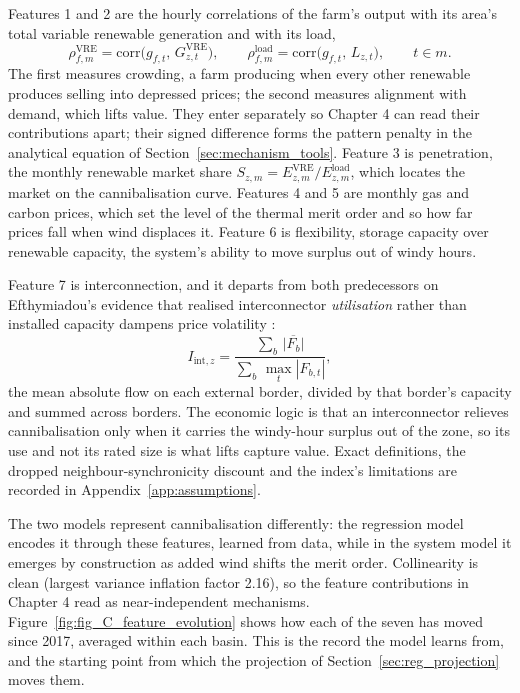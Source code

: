 Features 1 and 2 are the hourly correlations of the farm's output with its
area's total variable renewable generation and with its load,
%
\begin{equation}
    \rho^{\mathrm{VRE}}_{f,m} = \mathrm{corr}\bigl(g_{f,t},\,
    G^{\mathrm{VRE}}_{z,t}\bigr), \qquad
    \rho^{\mathrm{load}}_{f,m} = \mathrm{corr}\bigl(g_{f,t},\,
    L_{z,t}\bigr), \qquad t \in m.
    \label{eq:correlations}
\end{equation}
%
The first measures crowding, a farm producing when every other renewable
produces selling into depressed prices; the second measures alignment with
demand, which lifts value. They enter separately so Chapter 4 can read their
contributions apart; their signed difference forms the pattern penalty in the
analytical equation of Section~\ref{sec:mechanism_tools}. Feature 3 is
penetration, the monthly renewable market share $S_{z,m} =
E^{\mathrm{VRE}}_{z,m} / E^{\mathrm{load}}_{z,m}$, which locates the market on
the cannibalisation curve. Features 4 and 5 are monthly gas and carbon prices,
which set the level of the thermal merit order and so how far prices fall when
wind displaces it. Feature 6 is flexibility, storage capacity over renewable
capacity, the system's ability to move surplus out of windy hours.

Feature 7 is interconnection, and it departs from both predecessors on
Efthymiadou's evidence that realised interconnector \emph{utilisation} rather
than installed capacity dampens price volatility
\cite{Efthymiadou2025, Jacquet2024}:
%
\begin{equation}
    I_{\mathrm{int},z} =
    \frac{\sum_{b}\, \overline{|F_{b}|}}{\sum_{b}\, \max_{t} |F_{b,t}|},
    \label{eq:interconnection}
\end{equation}
%
the mean absolute flow on each external border, divided by that border's
capacity and summed across borders. The economic logic is that an
interconnector relieves cannibalisation only when it carries the
windy-hour surplus out of the zone, so its use and not its rated size is what
lifts capture value. Exact definitions, the dropped neighbour-synchronicity
discount and the index's limitations are recorded in
Appendix~\ref{app:assumptions}.

The two models represent cannibalisation differently: the regression model
encodes it through these features, learned from data, while in the system model
it emerges by construction as added wind shifts the merit order. Collinearity is
clean (largest variance inflation factor 2.16), so the feature contributions in
Chapter 4 read as near-independent mechanisms.
Figure~\ref{fig:fig_C_feature_evolution} shows how each of the seven has moved
since 2017, averaged within each basin. This is the record the model learns
from, and the starting point from which the projection of
Section~\ref{sec:reg_projection} moves them.

